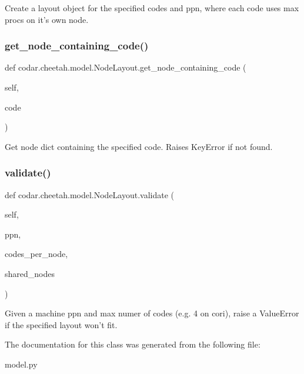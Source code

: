 \begin{DoxyVerb}Create a layout object for the specified codes and ppn, where each
code uses max procs on it's own node.\end{DoxyVerb}
 \mbox{\label{classcodar_1_1cheetah_1_1model_1_1_node_layout_a68224168f338df09ab150d5db29daa6b}} 
\subsubsection{\texorpdfstring{get\+\_\+node\+\_\+containing\+\_\+code()}{get\_node\_containing\_code()}}
{\footnotesize\ttfamily def codar.\+cheetah.\+model.\+Node\+Layout.\+get\+\_\+node\+\_\+containing\+\_\+code (\begin{DoxyParamCaption}\item[{}]{self,  }\item[{}]{code }\end{DoxyParamCaption})}

\begin{DoxyVerb}Get node dict containing the specified code. Raises KeyError if
not found.\end{DoxyVerb}
 \mbox{\label{classcodar_1_1cheetah_1_1model_1_1_node_layout_a7571a9432cf5f4e35ae885ccc8f8db15}} 
\subsubsection{\texorpdfstring{validate()}{validate()}}
{\footnotesize\ttfamily def codar.\+cheetah.\+model.\+Node\+Layout.\+validate (\begin{DoxyParamCaption}\item[{}]{self,  }\item[{}]{ppn,  }\item[{}]{codes\+\_\+per\+\_\+node,  }\item[{}]{shared\+\_\+nodes }\end{DoxyParamCaption})}

\begin{DoxyVerb}Given a machine ppn and max numer of codes (e.g. 4 on cori),
raise a ValueError if the specified layout won't fit.\end{DoxyVerb}
 

The documentation for this class was generated from the following file\+:\begin{DoxyCompactItemize}
\item 
model.\+py\end{DoxyCompactItemize}
